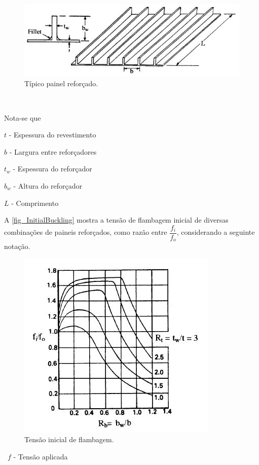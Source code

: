 \begin{figure}[h]
	\caption{\label{fig_StiffenedPanels}Típico painel reforçado.}
  \centering
  \includegraphics[scale=1.0]{figura/StiffenedPanel}
\end{figure}
\

Nota-se que\

$t$ -  Espessura do revestimento \

$b$ - Largura entre reforçadores \

$t_w$ - Espessura do reforçador \

$b_w$ - Altura do reforçador \

$L$ - Comprimento \
\

A \autoref{fig_InitialBuckling} mostra a tensão de flambagem inicial de diversas combinações de paineis reforçados, como razão entre $\dfrac{f_i}{f_o}$, considerando a seguinte notação.

\begin{figure}[h]
	\caption{\label{fig_InitialBuckling}Tensão inicial de flambagem.}
  \centering
  \includegraphics[scale=1.0]{figura/InitialBuckling}
\end{figure}
\
$f$ - Tensão aplicada\

